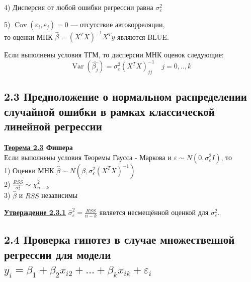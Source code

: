 \documentclass[a0,final]{a0poster}
\DeclareMathOperator{\Var}{Var}
\DeclareMathOperator{\Cov}{Cov}
\begin{document}
\begin{multicols}{4}
\begin{tcolorbox}[colback=red!5!white,colframe=red!75!black]
4) %
Дисперсия от любой ошибки регрессии равна $\sigma_{\varepsilon}^2$


5) $ \Cov{(\varepsilon_i, \varepsilon_j)} = 0$ — отсутствие автокорреляции, \\
то оценки МНК $\hat{\beta} = (X^TX)^{-1}X^Ty$ являются BLUE.
\end{tcolorbox}

\begin{tcolorbox}[colback=blue!5!white,colframe=blue!75!black]
Если выполнены условия ТГМ, то дисперсии МНК оценок следующие: \\
\[\Var{(\hat{\beta_j})}= \sigma^2_{\varepsilon}(X^TX)^{-1}_{jj} \quad j = 0,..,k\]
\end{tcolorbox}

\subsection*{\textbf{2.3 Предположение о нормальном распределении случайной ошибки в рамках классической линейной регрессии}}
\begin{tcolorbox}[colback=green!5!white,colframe=green!75!black]
\textbf{\underline{Теорема 2.3} Фишера}\\
Если выполнены условия Теоремы Гаусса - Маркова и $\varepsilon \sim N(0, \sigma^2_{\varepsilon}I)$, то \\
1) Оценки МНК $\hat{\beta} \sim N(\beta, \sigma^2_{\varepsilon}(X^TX)^{-1})$ \\
2) $\frac{RSS}{\sigma^2_{\varepsilon}} \sim \chi^2_{n-k}$ \\
3) $\hat{\beta}$ и $RSS$ независимы
\end{tcolorbox}

\begin{tcolorbox}[colback=green!5!white,colframe=green!75!black]
\textbf{\underline{Утверждение 2.3.1}} $\hat{\sigma}^2_{\varepsilon} = \frac{RSS}{n-k}$ является несмещённой оценкой для $\sigma^2_{\varepsilon}.$
\end{tcolorbox}

\columnbreak

\subsection*{\textbf{2.4 Проверка гипотез в случае множественной регрессии для модели $y_i={\beta}_1 +{\beta}_2x_{i2} + \ldots + \beta_kx_{ik} + {\varepsilon}_i$}}

\end{multicols}
\end{document}
